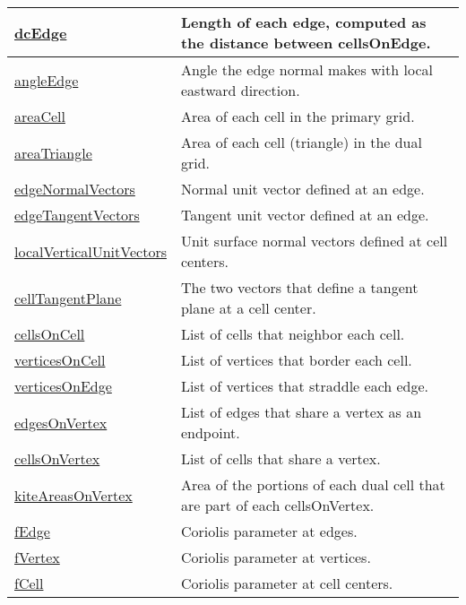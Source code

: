 {\begin{center}
\begin{longtable}{| p{2.0in} | p{4.0in} |}
	\hline
	\hyperref[subsec:var_sec_mesh_dcEdge]{dcEdge} & Length of each edge, computed as the distance between cellsOnEdge. \\
	\hline
	\hyperref[subsec:var_sec_mesh_angleEdge]{angleEdge} & Angle the edge normal makes with local eastward direction. \\
	\hline
	\hyperref[subsec:var_sec_mesh_areaCell]{areaCell} & Area of each cell in the primary grid. \\
	\hline
	\hyperref[subsec:var_sec_mesh_areaTriangle]{areaTriangle} & Area of each cell (triangle) in the dual grid. \\
	\hline
	\hyperref[subsec:var_sec_mesh_edgeNormalVectors]{edgeNormalVectors} & Normal unit vector defined at an edge. \\
	\hline
	\hyperref[subsec:var_sec_mesh_edgeTangentVectors]{edgeTangentVectors} & Tangent unit vector defined at an edge. \\
	\hline
	\hyperref[subsec:var_sec_mesh_localVerticalUnitVectors]{localVerticalUnitVectors} & Unit surface normal vectors defined at cell centers. \\
	\hline
	\hyperref[subsec:var_sec_mesh_cellTangentPlane]{cellTangentPlane} & The two vectors that define a tangent plane at a cell center. \\
	\hline
	\hyperref[subsec:var_sec_mesh_cellsOnCell]{cellsOnCell} & List of cells that neighbor each cell. \\
	\hline
	\hyperref[subsec:var_sec_mesh_verticesOnCell]{verticesOnCell} & List of vertices that border each cell. \\
	\hline
	\hyperref[subsec:var_sec_mesh_verticesOnEdge]{verticesOnEdge} & List of vertices that straddle each edge. \\
	\hline
	\hyperref[subsec:var_sec_mesh_edgesOnVertex]{edgesOnVertex} & List of edges that share a vertex as an endpoint. \\
	\hline
	\hyperref[subsec:var_sec_mesh_cellsOnVertex]{cellsOnVertex} & List of cells that share a vertex. \\
	\hline
	\hyperref[subsec:var_sec_mesh_kiteAreasOnVertex]{kiteAreasOnVertex} & Area of the portions of each dual cell that are part of each cellsOnVertex. \\
	\hline
	\hyperref[subsec:var_sec_mesh_fEdge]{fEdge} & Coriolis parameter at edges. \\
	\hline
	\hyperref[subsec:var_sec_mesh_fVertex]{fVertex} & Coriolis parameter at vertices. \\
	\hline
	\hyperref[subsec:var_sec_mesh_fCell]{fCell} & Coriolis parameter at cell centers. \\

\end{longtable}
\end{center}}
